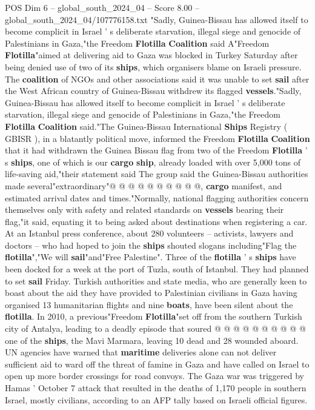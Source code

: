 \begin{textsample}{POS Dim 6 – global\_south\_2024\_04 – Score 8.00 – global\_south\_2024\_04/107776158.txt}  \label{ex:f6_pos_124}
"Sadly, Guinea-Bissau has allowed itself to become complicit in Israel ' s deliberate starvation, illegal siege and genocide of Palestinians in Gaza,"the Freedom \textbf{Flotilla} \textbf{Coalition} said A"Freedom \textbf{Flotilla}"aimed at delivering aid to Gaza was blocked in Turkey Saturday after being denied use of two of its \textbf{ships}, which organisers blame on Israeli pressure.
The \textbf{coalition} of NGOs and other associations said it was unable to set \textbf{sail} after the West African country of Guinea-Bissau withdrew its flagged \textbf{vessels}."Sadly, Guinea-Bissau has allowed itself to become complicit in Israel ' s deliberate starvation, illegal siege and genocide of Palestinians in Gaza,"the Freedom \textbf{Flotilla} \textbf{Coalition} said."The Guinea-Bissau International \textbf{Ships} Registry ( GBISR ), in a blatantly political move, informed the Freedom \textbf{Flotilla} \textbf{Coalition} that it had withdrawn the Guinea Bissau flag from two of the Freedom \textbf{Flotilla} ' s \textbf{ships}, one of which is our \textbf{cargo} \textbf{ship}, already loaded with over 5,000 tons of life-saving aid,"their statement said The group said the Guinea-Bissau authorities made several"extraordinary"@ @ @ @ @ @ @ @ @ @, \textbf{cargo} manifest, and estimated arrival dates and times."Normally, national flagging authorities concern themselves only with safety and related standards on \textbf{vessels} bearing their flag,"it said, equating it to being asked about destinations when registering a car.
At an Istanbul press conference, about 280 volunteers -- activists, lawyers and doctors -- who had hoped to join the \textbf{ships} shouted slogans including"Flag the \textbf{flotilla}","We will \textbf{sail}"and"Free Palestine".
Three of the \textbf{flotilla} ' s \textbf{ships} have been docked for a week at the port of Tuzla, south of Istanbul.
They had planned to set \textbf{sail} Friday.
Turkish authorities and state media, who are generally keen to boast about the aid they have provided to Palestinian civilians in Gaza having organised 13 humanitarian flights and nine \textbf{boats}, have been silent about the \textbf{flotilla}.
In 2010, a previous"Freedom \textbf{Flotilla}"set off from the southern Turkish city of Antalya, leading to a deadly episode that soured @ @ @ @ @ @ @ @ @ @ one of the \textbf{ships}, the Mavi Marmara, leaving 10 dead and 28 wounded aboard.
UN agencies have warned that \textbf{maritime} deliveries alone can not deliver sufficient aid to ward off the threat of famine in Gaza and have called on Israel to open up more border crossings for road convoys.
The Gaza war was triggered by Hamas ' October 7 attack that resulted in the deaths of 1,170 people in southern Israel, mostly civilians, according to an AFP tally based on Israeli official figures.

\end{textsample}
